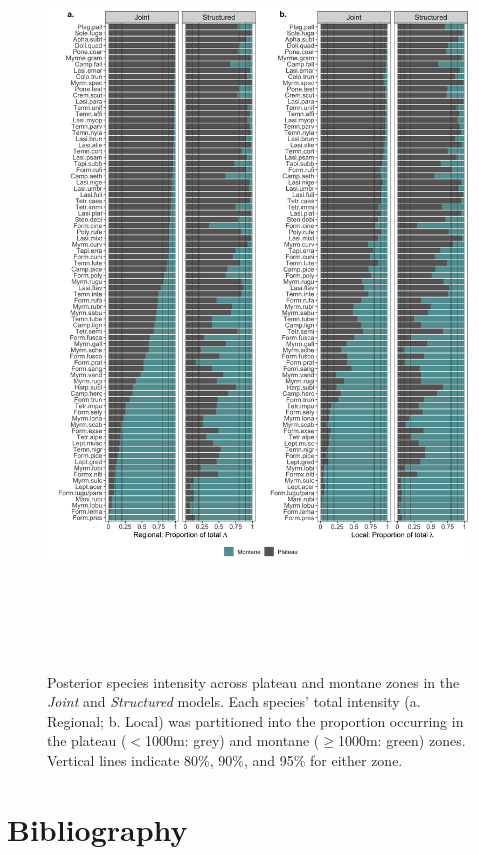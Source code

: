 \documentclass[preprint,review,times,12pt]{elsarticle}
\begin{document}
\begin{figure}
	\centering\includegraphics[height=8in]{ms/1_Ecography/1/figs/lambda_zones.png}
	\caption{\label{fig:lam_zones} Posterior species intensity across plateau and montane zones in the \emph{Joint} and \emph{Structured} models. Each species' total intensity (a. Regional; b. Local) was partitioned into the proportion occurring in the plateau ($<$1000m: grey) and montane ($\geq$1000m: green) zones. Vertical lines indicate 80\%, 90\%, and 95\% for either zone. }
\end{figure}




\newpage
\section{Bibliography}

\end{document}
